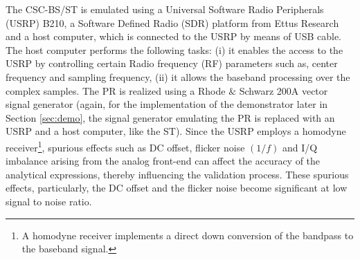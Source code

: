 The CSC-BS/ST is emulated using a Universal Software Radio Peripherals (USRP) B210, a Software Defined Radio (SDR) platform from Ettus Research \cite{Ettus} and a host computer, which is connected to the USRP by means of USB cable. The host computer performs the following tasks: (i) it enables the access to the USRP by controlling certain Radio frequency (RF) parameters such as, center frequency and sampling frequency, (ii) it allows the baseband processing over the complex samples. %
The PR is realized using a Rhode $\&$ Schwarz 200A vector signal generator (again, for the implementation of the demonstrator later in Section \ref{sec:demo}, the signal generator emulating the PR is replaced with an USRP and a host computer, like the ST). Since the USRP employs a homodyne receiver\footnote{A homodyne receiver implements a direct down conversion of the bandpass to the baseband signal.}, spurious effects such as DC offset, flicker noise $(1/f)$ and I/Q imbalance arising from the analog front-end can affect the accuracy of the analytical expressions, thereby influencing the validation process. These spurious effects, particularly, the DC offset and the flicker noise become significant at low signal to noise ratio. 


